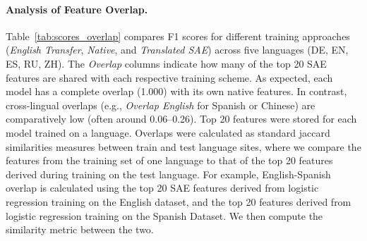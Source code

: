 \paragraph{Analysis of Feature Overlap.}
Table~\ref{tab:scores_overlap} compares F1 scores for different training approaches (\emph{English Transfer}, \emph{Native}, and \emph{Translated SAE}) across five languages (DE, EN, ES, RU, ZH). The \emph{Overlap} columns indicate how many of the top 20 SAE features are shared with each respective training scheme. As expected, each model has a complete overlap (1.000) with its own native features. In contrast, cross-lingual overlaps (e.g., \emph{Overlap English} for Spanish or Chinese) are comparatively low (often around 0.06--0.26). Top 20 features were stored for each model trained on a language. Overlaps were calculated as standard jaccard similarities measures between train and test language sites, where we compare the features from the training set of one language to that of the top 20 features derived during training on the test language. For example, English-Spanish overlap is calculated using the top 20 SAE features derived from logistic regression training on the English dataset, and the top 20 features derived from logistic regression training on the Spanish Dataset. We then compute the similarity metric between the two.


